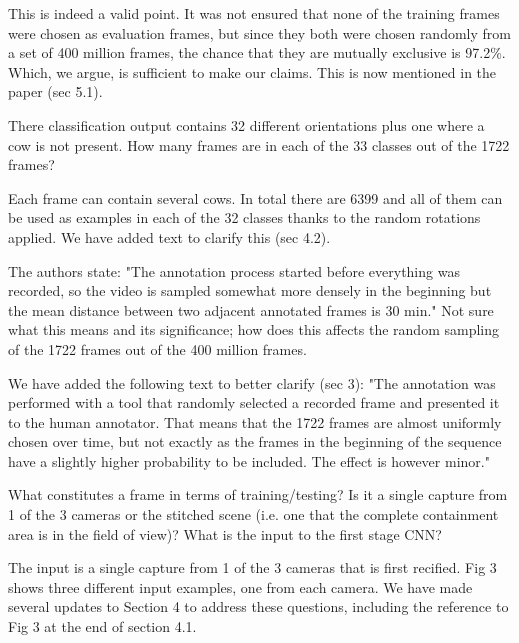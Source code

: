 \documentclass[10pt,a4paper]{letter}
\begin{document}
\begin{letter}{}
This is indeed a valid point. It was not ensured that none of the training frames were chosen as evaluation frames, but
since they both were chosen randomly from a set of 400 million frames, the
chance that they are mutually exclusive is 97.2\%. Which, we argue, is sufficient to make our claims. 
This is now mentioned in the paper (sec 5.1).

\begin{siderules}
There classification output contains 32 different orientations plus one where a cow is not present. How many frames are in each of the 33 classes 
out of the 1722 frames?
\end{siderules}

Each frame can contain several cows. In total there are 6399 and all of them
can be used as examples in each of the 32 classes thanks to the random
rotations applied. We have added text to clarify this (sec 4.2).

\begin{siderules}
The authors state: "The annotation process started before everything was recorded, so the video is sampled somewhat more densely in the beginning but 
the mean distance between two adjacent annotated frames is 30 min." Not sure what this means and its significance; how does this affects the random 
sampling of the 1722 frames out of the 400 million frames.
\end{siderules}

We have added the following text to better clarify (sec 3): "The annotation was performed with a tool that randomly selected a recorded
frame and presented it to the human annotator. That means that the 1722 frames are almost uniformly chosen over time, but not exactly as the frames in the beginning of the sequence have a slightly higher probability to
be included. The effect is however minor."

\begin{siderules}
What constitutes a frame in terms of training/testing? Is it a single capture from 1 of the 3 cameras or the stitched scene (i.e. one that the complete 
containment area is in the field of view)? What is the input to the first stage CNN?
\end{siderules}

The input is a single capture from 1 of the 3 cameras that is first recified. Fig 3 shows three different input examples, one from each camera. We have made several updates to Section 4 to address these questions, including the reference to Fig 3 at the end of section 4.1.


\end{letter}
\end{document}
